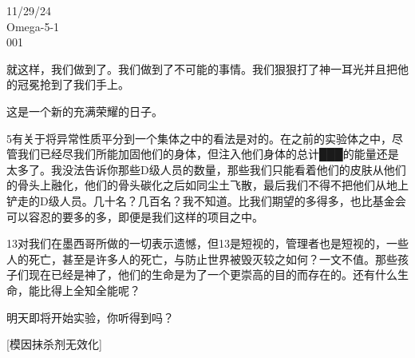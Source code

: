 


\begin{scpbox}

11/29/24\\
Omega-5-1\\
001

就这样，我们做到了。我们做到了不可能的事情。我们狠狠打了神一耳光并且把他的冠冕抢到了我们手上。

这是一个新的充满荣耀的日子。

5有关于将异常性质平分到一个集体之中的看法是对的。在之前的实验体之中，尽管我们已经尽我们所能加固他们的身体，但注入他们身体的总计███的能量还是太多了。我没法告诉你那些D级人员的数量，那些我们只能看着他们的皮肤从他们的骨头上融化，他们的骨头碳化之后如同尘土飞散，最后我们不得不把他们从地上铲走的D级人员。几十名？几百名？我不知道。比我们期望的多得多，也比基金会可以容忍的要多的多，即便是我们这样的项目之中。

13对我们在墨西哥所做的一切表示遗憾，但13是短视的，管理者也是短视的，一些人的死亡，甚至是许多人的死亡，与防止世界被毁灭较之如何？一文不值。那些孩子们现在已经是神了，他们的生命是为了一个更崇高的目的而存在的。还有什么生命，能比得上全知全能呢？

明天即将开始实验，你听得到吗？

\end{scpbox}




\begin{scpboxc}
{[模因抹杀剂无效化]}
\end{scpboxc}

